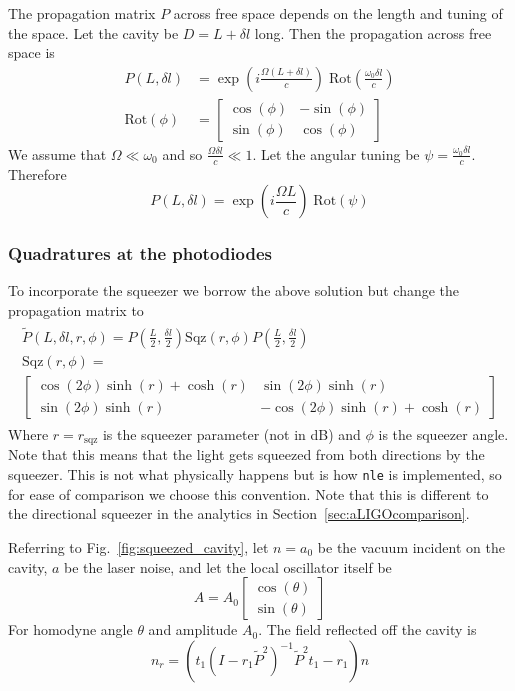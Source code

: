 \documentclass[aps,pra,superscriptaddress,reprint,nofootinbib]{revtex4-1}
\newcommand{\code}[1]{\texttt{#1}}
\begin{document}
The propagation matrix $P$ across free space depends on the length and tuning of the space. Let the cavity be $D = L + \delta l$ long. Then the propagation across free space is
\begin{align*}
P(L, \delta l) &= \exp\left(i\frac{\Omega (L + \delta l)}{c}\right) \;\mathrm{Rot}\left(\frac{\omega_0 \delta l}{c}\right) \\
\mathrm{Rot}(\phi) &= \begin{bmatrix}
\cos(\phi) & -\sin(\phi)\\ 
\sin(\phi) & \cos(\phi)
\end{bmatrix}
\end{align*}
We assume that $\Omega \ll \omega_0$ and so $\frac{\Omega \delta l}{c} \ll 1$. Let the angular tuning be $\psi = \frac{\omega_0 \delta l}{c}$. Therefore $$P(L, \delta l) = \exp\left(i\frac{\Omega L}{c}\right) \;\mathrm{Rot}\left(\psi\right)$$

\subsubsection{Quadratures at the photodiodes}

To incorporate the squeezer we borrow the above solution but change the propagation matrix to
\begin{align*}
	\begin{gathered}
	\tilde{P}(L, \delta l, r, \phi) = P\left(\frac{L}{2}, \frac{\delta l}{2}\right) \mathrm{Sqz}(r, \phi) P\left(\frac{L}{2}, \frac{\delta l}{2}\right) \\
	\mathrm{Sqz}(r, \phi) =\\
	\begin{bmatrix}
	\cos(2 \phi) \sinh(r) + \cosh(r) & \sin(2\phi) \sinh(r)\\ 
	\sin(2\phi) \sinh(r) & -\cos(2 \phi) \sinh(r) + \cosh(r)
	\end{bmatrix}
	\end{gathered}
\end{align*}
Where $r = r_\mathrm{sqz}$ is the squeezer parameter (not in dB) and $\phi$ is the squeezer angle. Note that this means that the light gets squeezed from both directions by the squeezer. This is not what physically happens but is how \code{nle} is implemented, so for ease of comparison we choose this convention. Note that this is different to the directional squeezer in the analytics in Section~\ref{sec:aLIGOcomparison}.


Referring to Fig.~\ref{fig:squeezed_cavity}, let $n = a_0$ be the vacuum incident on the cavity, $a$ be the laser noise, and let the local oscillator itself be
$$A = A_0 \begin{bmatrix}
\cos(\theta)\\ 
\sin(\theta)
\end{bmatrix}$$
For homodyne angle $\theta$ and amplitude $A_0$. The field reflected off the cavity is
$$n_r = \left(t_1 (I - r_1 \tilde{P}^2)^{-1} \tilde{P}^2 t_1 - r_1 \right) n$$
\end{document}
